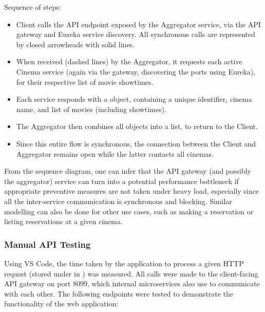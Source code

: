 Sequence of steps:
\begin{itemize}
  \item Client calls the API endpoint  exposed by the Aggregator service, via the API gateway and Eureka service discovery. All synchronous calls are represented by closed arrowheads with solid lines.
  \item When received (dashed lines) by the Aggregator, it requests each active Cinema service (again via the gateway, discovering the ports using Eureka), for their respective list of movie showtimes.
  \item Each service responds with a  object, containing a unique identifier, cinema name, and list of movies (including showtimes).
  \item The Aggregator then combines all  objects into a list, to return to the Client.
  \item Since this entire flow is synchronous, the connection between the Client and Aggregator remains open while the latter contacts all cinemas.
\end{itemize}

From the sequence diagram, one can infer that the API gateway (and possibly the aggregator) service can turn into a potential performance bottleneck if appropriate preventive measures are not taken under heavy load, especially since all the inter-service communication is synchronous and blocking. Similar modelling can also be done for other use cases, such as making a reservation or listing reservations at a given cinema.

\subsubsection{Manual API Testing}

Using VS Code, the time taken by the application to process a given HTTP request (stored under  in ) was measured. All calls were made to the client-facing API gateway on port 8099, which internal microservices also use to communicate with each other. The following endpoints were tested to demonstrate the functionality of the web application:


